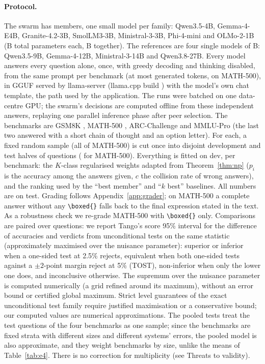 \documentclass[11pt]{article}
\theoremstyle{definition}
\theoremstyle{remark}
\begin{document}
\paragraph{Protocol.} The swarm has \eFourFamilies{} members, one small model per family: Qwen3.5-4B,
Gemma-4-E4B, Granite-4.2-3B, SmolLM3-3B, Ministral-3-3B, Phi-4-mini and OLMo-2-1B
(\eFourSwarmSize{}B total parameters each, \eFourSwarmParams{}B together). The references are four single
models of \eFourRefSizes{}B: Qwen3.5-9B, Gemma-4-12B, Ministral-3-14B and Qwen3.8-27B. Every model answers
every question alone, once, with greedy decoding and thinking disabled, from the same prompt per benchmark
(at most \eFourGsmMaxTokens{} generated tokens, \eFourMathMaxTokens{} on MATH-500), in \eFourQuant{} GGUF
served by llama-server (llama.cpp build \eFourBuild) with the model's own chat template, the path used by
the application. The runs were batched on one data-centre GPU; the swarm's decisions are computed offline
from these independent answers, replaying one parallel inference phase after peer selection. The benchmarks are GSM8K
\cite{cobbe2021gsm8k}, MATH-500 \cite{hendrycks2021math,lightman2023verify}, ARC-Challenge
\cite{clark2018arc} and MMLU-Pro \cite{wang2024mmlupro} (the last two answered with a short chain of thought and an option
letter). For each, a fixed random sample (all of MATH-500) is cut once into disjoint development and test
halves of \eFourGsmN{} questions (\eFourMathN{} for MATH-500). Everything is fitted on dev, per benchmark: the $K$-class
regularised weights adapted from Theorem~\ref{thm:np} ($p_i$ is the accuracy among the answers given, $c$ the collision
rate of
wrong answers), and the ranking used by the ``best member'' and ``$k$ best'' baselines. All numbers are on
test. Grading follows Appendix~\ref{app:grader}; on MATH-500 a complete answer without any
\texttt{\textbackslash boxed\{\}} falls back to the final expression stated in the text. As a robustness
check we re-grade MATH-500 with \texttt{\textbackslash boxed\{\}} only. Comparisons are paired over
questions: we report Tango's score 95\% interval for the difference of accuracies \cite{tango1998equivalence}
and verdicts from unconditional tests on the same statistic (approximately maximised over the nuisance
parameter):
superior or inferior when a one-sided test at 2.5\% rejects, equivalent when both one-sided tests against a
$\pm2$-point margin reject at 5\% (TOST), non-inferior when only the lower one does, and inconclusive
otherwise. The supremum over the nuisance parameter is computed numerically (a grid refined around its
maximum), without an error bound or certified global maximum. Strict level guarantees of the exact
unconditional test family require justified maximisation or a conservative bound; our computed values
are numerical approximations. The pooled tests treat the test questions of the four benchmarks as one sample; since the
benchmarks are fixed strata with different sizes and different systems' errors, the pooled model is
also approximate, and they weight benchmarks by size, unlike the means of Table~\ref{tab:e4}. There is no
correction for multiplicity (see Threats to validity).
\end{document}
